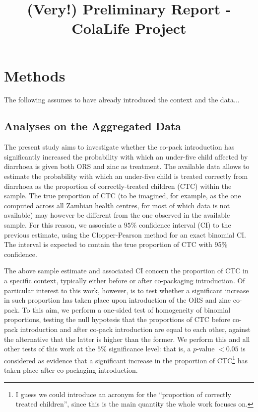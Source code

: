 \documentclass[a4paper, 12pt]{article}
\title{(Very!) Preliminary Report - ColaLife Project}
\author{}
\date{}
\begin{document}
\maketitle


\section{Methods}
The following assumes to have already introduced the context and the data...

\subsection{Analyses on the Aggregated Data}
The present study aims to investigate whether the co-pack introduction has significantly increased the probability with which an under-five child affected by diarrhoea is given both ORS and zinc as treatment.
The available data allows to estimate the probability with which an under-five child is treated correctly from diarrhoea as the proportion of correctly-treated children (CTC) within the sample. 
The true proportion of CTC (to be imagined, for example, as the one computed across all Zambian health centres, for most of which data is not available) may however be different from the one observed in the available sample. For this reason, we associate a $95\%$ confidence interval (CI) to the previous estimate, using the Clopper-Pearson method for an exact binomial CI. The interval is expected to contain the true proportion of CTC with 95\% confidence.

The above sample estimate and associated CI concern the proportion of CTC in a specific context, typically either before or after co-packaging introduction. Of particular interest to this work, however, is to test whether a significant increase in such proportion has taken place upon introduction of the ORS and zinc co-pack. To this aim, we perform a one-sided test of homogeneity of binomial proportions, testing the null hypotesis that the proportions of CTC before co-pack introduction and after co-pack introduction are equal to each other, against the alternative that the latter is higher than the former.
We perform this and all other tests of this work at the $5\%$ significance level: that is, a $p$-value $<0.05$ is considered as evidence that a significant increase in the proportion of CTC\footnote{I guess we could introduce an acronym for the ``proportion of correctly treated children'', since this is the main quantity the whole work focuses on.} has taken place after co-packaging introduction.
\end{document}
